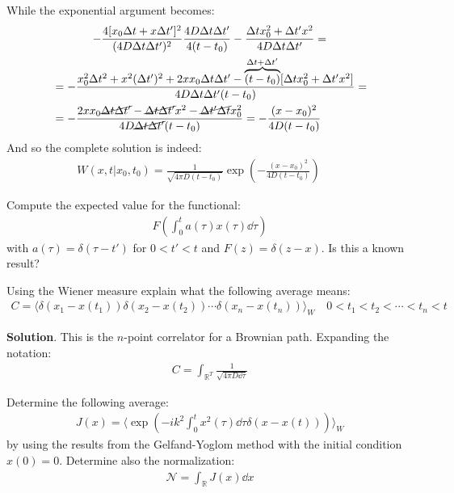 \documentclass[../template.tex]{subfiles}
\begin{document}
\begin{exo}
    While the exponential argument becomes:
    \begin{align*}
        -\frac{4 [x_0 \Delta t + x \Delta t']^2}{(4D \Delta t \Delta t' )^2} \frac{4D \Delta t \Delta t'}{4 (t-t_0)}  - \frac{\Delta t x_0^2 + \Delta t' x^2}{4D \Delta t \Delta t'} = \span \\
        &= -\frac{x_0^2 \Delta t^2 + x^2 (\Delta t')^2 + 2x x_0 \Delta t \Delta t' - \overbrace{(t-t_0)}^{\Delta t+ \Delta t'}[\Delta t x_0^2 + \Delta t' x^2]  }{4D \Delta t \Delta t' (t-t_0)} =\\
        &=-\frac{2x x_0 \cancel{\Delta t \Delta t' }- \cancel{\Delta t \Delta t' }x^2 - \cancel{\Delta t' \Delta t} x_0^2  }{4D \cancel{\Delta t \Delta t'} (t-t_0)} = - \frac{(x-x_0)^2}{4D (t-t_0)} 
    \end{align*}
    And so the complete solution is indeed:
    \begin{align*}
        W(x,t|x_0,t_0) = \frac{1}{\sqrt{4 \pi D (t-t_0)}}  \exp\left(-\frac{(x - x_0)^2}{4D (t-t_0)} \right) \qquad 
    \end{align*}
\end{exo}

\begin{exo}
    Compute the expected value for the functional:
    \begin{align*}
        F\left(\int_0^t a(\tau) x(\tau) \dd{\tau }\right)
    \end{align*}
    with $a(\tau) = \delta(\tau - t')$ for $0<t'<t$ and $F(z) = \delta (z-x)$. Is this a known result?
\end{exo}

\begin{exo}
    Using the Wiener measure explain what the following average means:
    \begin{align*}
       C= \langle \delta(x_1 - x(t_1)) \delta(x_2 - x(t_2)) \cdots \delta(x_n - x(t_n)) \rangle_W \quad 0<t_1 <t_2 < \cdots < t_n < t
    \end{align*}

    \medskip

    \textbf{Solution}. This is the $n$-point correlator for a Brownian path. Expanding the notation:
    \begin{align*}
        C = \int_{\mathbb{R}^T} \frac{1}{\sqrt{4 \pi D \dd{\tau}}} 
    \end{align*} 
\end{exo}

\begin{exo}
    Determine the following average:
    \begin{align*}
        J(x) = \langle \exp\left(-ik^2 \int_0^t x^2(\tau) \dd{\tau} \delta(x-x(t))\right) \rangle_W
    \end{align*}
    by using the results from the Gelfand-Yoglom method with the initial condition $x(0)=0$. Determine also the normalization:
    \begin{align*}
       \mathcal{N} = \int_{\mathbb{R}} J(x) \dd{x}
    \end{align*}
\end{exo}
\end{document}
